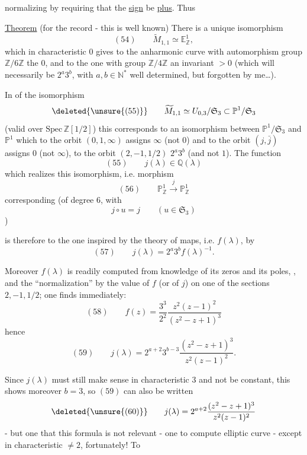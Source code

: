 
normalizing by requiring that the \uline{sign} be \uline{plus}. Thus

\uline{Theorem} (for the record - this is well known) There is a unique isomorphism
\[
(54)\qquad
\widetilde M_{1,1}\simeq\mathbb E^1_{\mathbb Z},
\]
which  in characteristic $0$ gives to the anharmonic curve with
automorphism group $\mathbb Z/6\mathbb Z$
the  $0$, and to the one with
group $\mathbb Z/4\mathbb Z$ an invariant  $>0$
(which will necessarily be $2^a3^b$, with $a,b\in\mathbb N^*$ well
determined, but forgotten by me\ldots).

In  of the isomorphism
\[
\deleted{\unsure{(55)}}\qquad
\widetilde M_{1,1}\simeq U_{0,3}/\mathfrak S_3
\subset \mathbb P^1/\mathfrak S_3
\]
(valid over $\mathrm{Spec}\,\mathbb Z[1/2]$)
this corresponds to  an isomorphism between
$\mathbb P^1/\mathfrak S_3$ and $\mathbb P^1$ which to the orbit
$(0,1,\infty)$ assigns $\infty$ (not $0$) and to the orbit $(j,\bar j)$
assigns $0$ (not $\infty$), to the orbit $(2,-1,1/2)$
 $2^a3^b$ (and not $1$). The function
\[
(55)\qquad j(\lambda)\in\mathbb Q(\lambda)
\]
which realizes this isomorphism, i.e.   morphism
\[
(56)\qquad
\mathbb P^1_{\mathbb Z}\xrightarrow{j}\mathbb P^1_{\mathbb Z}
\]
corresponding (of degree $6$, with
\[
j\circ u=j
\qquad(u\in\mathfrak S_3)
\]
)


is therefore  to the one inspired by the theory of maps,
i.e. $f(\lambda)$, by
\[
(57)\qquad
j(\lambda)=2^a3^b f(\lambda)^{-1}.
\]

Moreover $f(\lambda)$  is readily computed
from knowledge of its zeros and its poles,
,
 and the ``normalization'' by the value of $f$
(or of $j$) on one of the sections $2,-1,1/2$; one finds immediately:
\[
(58)\qquad
f(z)=\frac{3^3}{2^2}\frac{z^2(z-1)^2}{(z^2-z+1)^3}
\]
hence
\[
(59)\qquad
j(\lambda)=2^{a+2}3^{b-3}\frac{(z^2-z+1)^3}{z^2(z-1)^2}.
\]

Since $j(\lambda)$ must still make sense in characteristic $3$ and not be
constant, this shows moreover \uline{$b=3$}, so $(59)$ can also be written
\[
\deleted{\unsure{(60)}}\qquad
j(\lambda)=2^{a+2}\frac{(z^2-z+1)^3}{z^2(z-1)^2}
\]
- but one  that this formula is not relevant -
 one to compute
elliptic curve - except in characteristic $\ne 2$, fortunately!
To 

